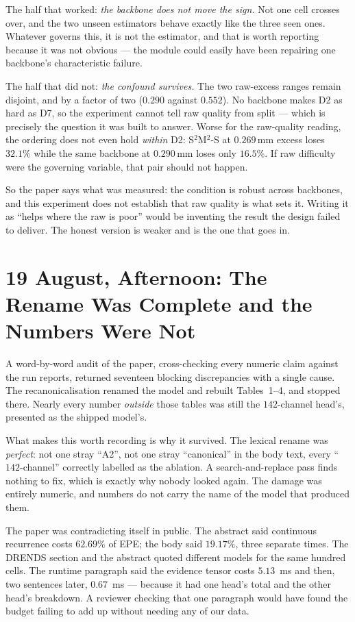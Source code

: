 \documentclass[11pt,a4paper]{article}
\begin{document}
The half that worked: \emph{the backbone does not move the sign.} Not one cell
crosses over, and the two unseen estimators behave exactly like the three seen
ones. Whatever governs this, it is not the estimator, and that is worth reporting
because it was not obvious --- the module could easily have been repairing one
backbone's characteristic failure.

The half that did not: \emph{the confound survives.} The two raw-excess ranges
remain disjoint, and by a factor of two ($0.290$ against $0.552$). No backbone
makes D2 as hard as D7, so the experiment cannot tell raw quality from split ---
which is precisely the question it was built to answer. Worse for the raw-quality
reading, the ordering does not even hold \emph{within} D2: S$^2$M$^2$-S at
$0.269$\,mm excess loses $32.1\%$ while the same backbone at $0.290$\,mm loses only
$16.5\%$. If raw difficulty were the governing variable, that pair should not
happen.

So the paper says what was measured: the condition is robust across backbones, and
this experiment does not establish that raw quality is what sets it. Writing it as
``helps where the raw is poor'' would be inventing the result the design failed to
deliver. The honest version is weaker and is the one that goes in.

\section*{19 August, Afternoon: The Rename Was Complete and the Numbers Were Not}

A word-by-word audit of the paper, cross-checking every numeric claim against the
run reports, returned seventeen blocking discrepancies with a single cause. The
recanonicalisation renamed the model and rebuilt Tables~1--4, and stopped there.
Nearly every number \emph{outside} those tables was still the $142$-channel head's,
presented as the shipped model's.

What makes this worth recording is why it survived. The lexical rename was
\emph{perfect}: not one stray ``A2'', not one stray ``canonical'' in the body text,
every ``$142$-channel'' correctly labelled as the ablation. A search-and-replace pass
finds nothing to fix, which is exactly why nobody looked again. The damage was
entirely numeric, and numbers do not carry the name of the model that produced them.

The paper was contradicting itself in public. The abstract said continuous recurrence
costs $62.69\%$ of EPE; the body said $19.17\%$, three separate times. The DRENDS
section and the abstract quoted different models for the same hundred cells. The
runtime paragraph said the evidence tensor costs $5.13$~ms and then, two sentences
later, $0.67$~ms --- because it had one head's total and the other head's breakdown.
A reviewer checking that one paragraph would have found the budget failing to add up
without needing any of our data.
\end{document}
